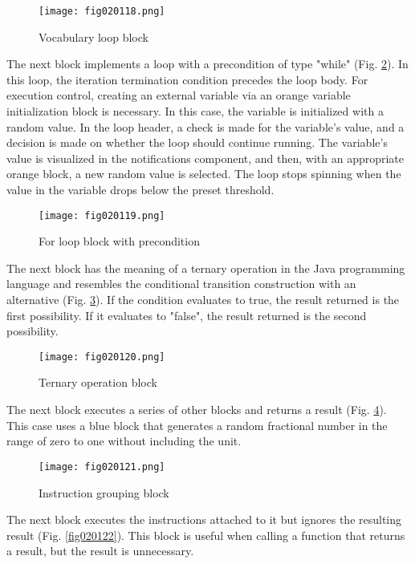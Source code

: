 \begin{figure}[H]
   \centering
   \texttt{[image: fig020118.png]}
   \caption{Vocabulary loop block}
\label{fig020118}
\end{figure}

The next block implements a loop with a precondition of type "while" (Fig. \ref{fig020119}). In this loop, the iteration termination condition precedes the loop body. For execution control, creating an external variable via an orange variable initialization block is necessary. In this case, the variable is initialized with a random value. In the loop header, a check is made for the variable's value, and a decision is made on whether the loop should continue running. The variable's value is visualized in the notifications component, and then, with an appropriate orange block, a new random value is selected. The loop stops spinning when the value in the variable drops below the preset threshold.

\begin{figure}[H]
   \centering
   \texttt{[image: fig020119.png]}
   \caption{For loop block with precondition}
\label{fig020119}
\end{figure}

The next block has the meaning of a ternary operation in the Java programming language and resembles the conditional transition construction with an alternative (Fig. \ref{fig020120}). If the condition evaluates to true, the result returned is the first possibility. If it evaluates to "false", the result returned is the second possibility.

\begin{figure}[H]
   \centering
   \texttt{[image: fig020120.png]}
   \caption{Ternary operation block}
\label{fig020120}
\end{figure}

The next block executes a series of other blocks and returns a result (Fig. \ref{fig020121}). This case uses a blue block that generates a random fractional number in the range of zero to one without including the unit.

\begin{figure}[H]
   \centering
   \texttt{[image: fig020121.png]}
   \caption{Instruction grouping block}
\label{fig020121}
\end{figure}

The next block executes the instructions attached to it but ignores the resulting result (Fig. \ref{fig020122}). This block is useful when calling a function that returns a result, but the result is unnecessary.

